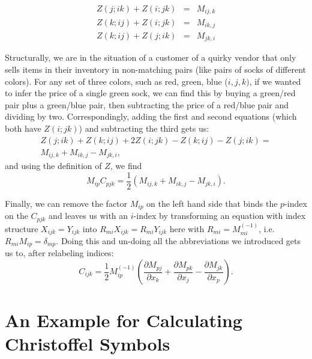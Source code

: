 \documentclass[twocolumn]{article}
\begin{document}
\begin{equation}
  \begin{array}{lcl}
    Z(j;ik) + Z(i;jk) & = & M_{ij,k}\\
    Z(k;ij) + Z(i;jk) & = & M_{ik,j}\\
    Z(k;ij) + Z(j;ik) & = & M_{jk,i}
  \end{array}
\end{equation}

Structurally, we are in the situation of a customer of a quirky vendor
that only sells items in their inventory in non-matching pairs
(like pairs of socks of different colors). For any set of three colors,
such as red, green, blue ($i,j,k)$, if we wanted to infer the price of a single
green sock, we can find this by buying a green/red pair plus a green/blue pair,
then subtracting the price of a red/blue pair and dividing by two.
Correspondingly, adding the first and second equations (which both have $Z(i;jk)$)
and subtracting the third gets us:
%
\begin{equation}
  \begin{array}{l}
    Z(j;ik) + Z(k;ij) + 2Z(i;jk)  - Z(k;ij) - Z(j;ik) =\\
    M_{ij,k} + M_{ik,j}-M_{jk,i},
  \end{array}
\end{equation}
%
and using the definition of $Z$, we find
\begin{equation}
  M_{ip}C_{pjk} = \frac{1}{2}\left(M_{ij,k}+M_{ik,j}-M_{jk,i}\right).
\end{equation}

Finally, we can remove the factor $M_{ip}$ on the left hand side that
binds the $p$-index on the $C_{pjk}$ and leaves us with an $i$-index
by transforming an equation with index structure $X_{ijk} = Y_{ijk}$
into $R_{mi}X_{ijk}=R_{mi}Y_{ijk}$ here with $R_{mi} = M^{(-1)}_{mi}$,
i.e. $R_{mi}M_{ip}=\delta_{mp}$. Doing this and un-doing all the
abbreviations we introduced gets us to, after relabeling indices:
%
\begin{equation}
  C_{ijk} = \frac{1}{2}M^{(-1)}_{ip}\left(\frac{\partial M_{pj}}{\partial x_k} + \frac{\partial M_{pk}}{\partial x_j} - \frac{\partial M_{jk}}{\partial x_p}\right).
\end{equation}

\section{An Example for Calculating Christoffel Symbols}\label{app:ChristoffelExample}
\end{document}
